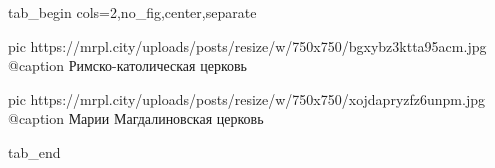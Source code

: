  
 
 
 
 


\ifcmt
  tab_begin cols=2,no_fig,center,separate

     pic https://mrpl.city/uploads/posts/resize/w/750x750/bgxybz3ktta95acm.jpg
		 @caption Римско-католическая церковь

		 pic https://mrpl.city/uploads/posts/resize/w/750x750/xojdapryzfz6unpm.jpg
		 @caption Марии Магдалиновская церковь

  tab_end
\fi
